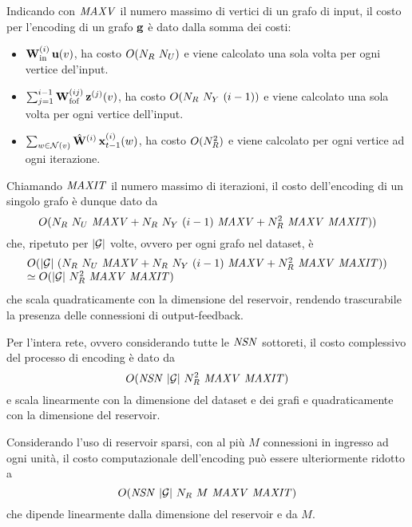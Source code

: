 Indicando con $\mathit{MAXV}$ il numero massimo di vertici di un grafo di input, il costo per l'encoding di un grafo $\mathbf{g}$ è dato dalla somma dei costi:
\begin{itemize}
\item $\matr{W}^{(i)}_\textup{in} \, \vect{u}(v)$, ha costo $O(\Nr\ \Nu)$ e viene calcolato una sola volta per ogni vertice del'input.
\item $\sum_{j=1}^{i-1} \matr{W}^{(ij)}_\textup{fof} \, \vect{z}^{(j)}(v)$, ha costo $O(N_R\ N_Y\ (i-1))$ e viene calcolato una sola volta per ogni vertice dell'input.
\item $\sum_{w \in \mathcal{N}(v)} \hat{\matr{W}}^{(i)} \, \vect{x}^{(i)}_{t-1}(w)$, ha costo $O(N_R^2)$ e viene calcolato per ogni vertice ad ogni iterazione.
\end{itemize}
Chiamando $\mathit{MAXIT}$ il numero massimo di iterazioni, il costo dell'encoding di un singolo grafo è dunque  dato da
\begin{equation}
O(\Nr\ \Nu\ \MAXV + \Nr\ \Ny\ (i-1)\ \MAXV + \Nr^2\ \MAXV\ \MAXIT))
\end{equation}
che, ripetuto per $\lvert\mathcal{G}\rvert$ volte, ovvero per ogni grafo nel dataset, è
\begin{equation}
\begin{array}{l}
O(\lvert\mathcal{G}\rvert\ (N_R\ N_U\ \mathit{MAXV} + N_R\ N_Y\ (i-1)\ \mathit{MAXV} + N_R^2\ \mathit{MAXV}\ \mathit{MAXIT})) \\
\simeq O(\lvert\mathcal{G}\rvert\ N_R^2\ \mathit{MAXV}\ \mathit{MAXIT})
\end{array}
\end{equation}
che scala quadraticamente con la dimensione del reservoir, rendendo trascurabile la presenza delle connessioni di output-feedback.

Per l'intera rete, ovvero considerando tutte le $\mathit{NSN}$ sottoreti, il costo complessivo del processo di encoding è dato da
\begin{equation}
O(\NSN\ \G\ \Nr^2\ \MAXV\ \MAXIT)
\end{equation}
e scala linearmente con la dimensione del dataset e dei grafi e quadraticamente con la dimensione del reservoir.

Considerando l'uso di reservoir sparsi, con al più $M$ connessioni in ingresso ad ogni unità, il costo computazionale dell'encoding può essere ulteriormente ridotto a 
\begin{equation}
O(\mathit{NSN}\ \lvert\mathcal{G}\rvert\ N_R\ M\ \mathit{MAXV}\ \mathit{MAXIT})
\end{equation}
che dipende linearmente dalla dimensione del reservoir e da $M$.

